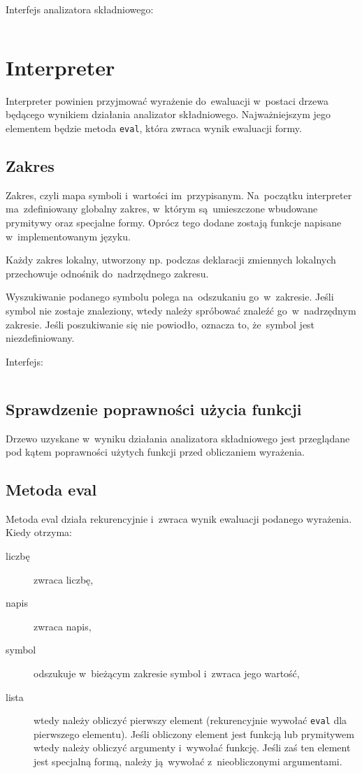 \documentclass[a4paper,11pt]{article}
\newcommand{\impl}[1]{
\inputminted[fontsize=\footnotesize,frame=single,samepage=true]{java}{impl/#1.java}
}
\begin{document}
Interfejs analizatora składniowego:
\impl{Parser}

\section{Interpreter}

Interpreter powinien przyjmować wyrażenie do~ewaluacji w~postaci drzewa
będącego wynikiem działania analizator składniowego. Najważniejszym jego
elementem będzie metoda \verb+eval+, która zwraca wynik ewaluacji formy.

\subsection{Zakres}

Zakres, czyli mapa symboli i~wartości im~przypisanym. Na~początku interpreter
ma~zdefiniowany globalny zakres, w~którym są~umieszczone wbudowane prymitywy
oraz specjalne formy. Oprócz tego dodane zostają funkcje napisane
w~implementowanym języku.

Każdy zakres lokalny, utworzony np. podczas deklaracji zmiennych lokalnych
przechowuje odnośnik do~nadrzędnego zakresu.

Wyszukiwanie podanego symbolu polega na~odszukaniu go~w~zakresie. Jeśli symbol
nie zostaje znaleziony, wtedy należy spróbować znaleźć go~w~nadrzędnym
zakresie. Jeśli poszukiwanie się nie powiodło, oznacza to, że~symbol jest
niezdefiniowany.

Interfejs:
\impl{Scope}

\subsection{Sprawdzenie poprawności użycia funkcji}

Drzewo uzyskane w~wyniku działania analizatora składniowego jest przeglądane pod
kątem poprawności użytych funkcji przed obliczaniem wyrażenia.

\subsection{Metoda eval}

Metoda eval działa rekurencyjnie i~zwraca wynik ewaluacji podanego wyrażenia.
Kiedy otrzyma:
\begin{description}
\item[liczbę] zwraca liczbę,
\item[napis] zwraca napis,
\item[symbol] odszukuje w~bieżącym zakresie symbol i~zwraca jego wartość,
\item[lista] wtedy należy obliczyć pierwszy element (rekurencyjnie wywołać
  \verb+eval+ dla pierwszego elementu). Jeśli obliczony element jest funkcją
  lub prymitywem wtedy należy obliczyć argumenty i~wywołać funkcję. Jeśli zaś
  ten element jest specjalną formą, należy ją~wywołać z~nieobliczonymi
  argumentami.
\end{description}
\end{document}
